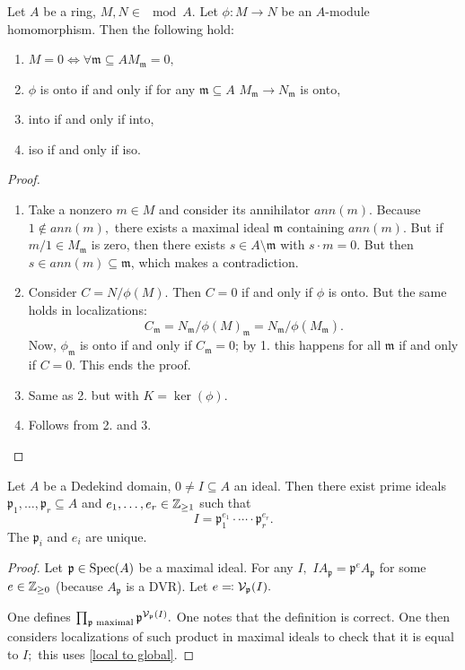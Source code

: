 \begin{lemma}
  \label{local to global}
  Let \(A\) be a ring, \(M, N \in \mod{A}.\) Let \(\phi \colon M \to N\) be an \(A\)-module homomorphism.
  Then the following hold:
  \begin{enumerate}
  \item \(M = 0 \iff \forall \mathfrak m \subseteq A M_{\mathfrak m} = 0,\)
  \item \(\phi\) is onto if and only if for any \(\mathfrak m \subseteq A\) \(M_{\mathfrak m} \to N_{\mathfrak m}\) is onto,
  \item into if and only if into,
  \item iso if and only if iso.
  \end{enumerate}
\end{lemma}
\begin{proof}
  \begin{enumerate}
  \item Take a  nonzero \(m \in M\) and consider its annihilator \(ann(m).\) Because \(1 \notin ann(m), \) there exists a maximal ideal \(\mathfrak m\) containing \(ann(m).\)
    But if \(m / {1} \in M_{\mathfrak m}\) is zero, then there exists \(s \in A \setminus \mathfrak m\) with \(s \cdot m = 0.\) But then \(s \in ann(m) \subseteq \mathfrak m\), which makes a contradiction.
  \item Consider \(C = N /{\phi(M)}.\) Then \(C = 0\) if and only if \(\phi\) is onto. But the same holds in localizations:
    \[C_{\mathfrak m} = N_{\mathfrak m} /{\phi(M)_{\mathfrak m}} = N_{\mathfrak m} / {\phi(M_{\mathfrak m})}.\]
    Now, \(\phi_{\mathfrak m}\) is onto if and only if \(C_\mathfrak m = 0\); by 1. this happens for all \(\mathfrak m\) if and only if \(C = 0\). This ends the proof.
  \item Same as 2. but with \(K = \ker(\phi).\)
  \item Follows from 2. and 3.
  \end{enumerate}
\end{proof}

\begin{theorem}
  \label{Dedekind thingy}
  Let \(A\) be a Dedekind domain, \(0 \neq I \subseteq A\) an ideal. Then there exist prime ideals \(\mathfrak p_1, \dotsc, \mathfrak p_r \subseteq A\) and \(e_1, \dotsc, e_r \in \mathbb Z_{\geq 1}\) such that
  \[I = \mathfrak p_1^{e_1} \cdot \dotsm \cdot \mathfrak p_r^{e_r}.\]
  The \(\mathfrak p_i\) and \(e_i\) are unique.
\end{theorem}
\begin{proof}
  Let \(\mathfrak p \in \text{Spec}(A)\) be a maximal ideal. For any \(I,\) \(I A_{\mathfrak p} = \mathfrak p^e A_{\mathfrak p}\)  for some \(e \in \mathbb Z_{\geq 0}\) (because \(A_{\mathfrak p}\) is a DVR). Let \(e \eqqcolon \mathcal V_{\mathfrak p}(I).\)

  One defines
  \(\prod_{\mathfrak p \text{ maximal}} \mathfrak p^{\mathcal V_{\mathfrak p}(I)}.\)
  One notes that the definition is correct.
  One then considers localizations of such product in maximal ideals to check that it is equal to \(I;\) this uses \cref{local to global}.
\end{proof}

